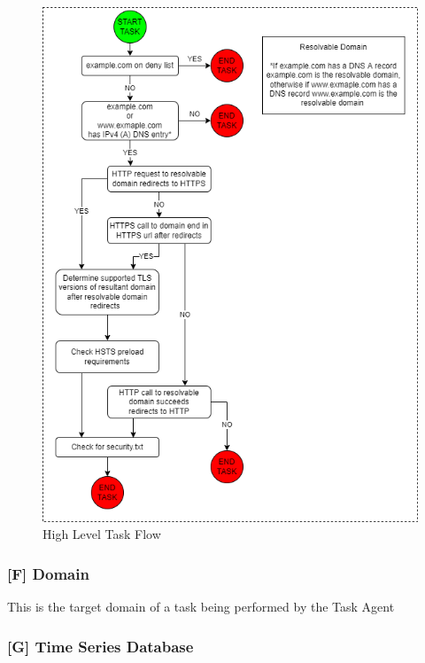 \documentclass{mscreport}
\begin{document}
\begin{figure}[p]
	\begin{center}
		\includegraphics[scale=0.75]{../images/Task_Flowv2.png}
%        
		\caption{High Level Task Flow}
		\label{fig:task_hla}
	\end{center}
\end{figure}

\clearpage
\newpage

\subsubsection{[F] Domain}

This is the target domain of a task being performed by the Task Agent

\subsubsection{[G] Time Series Database}
\end{document}
